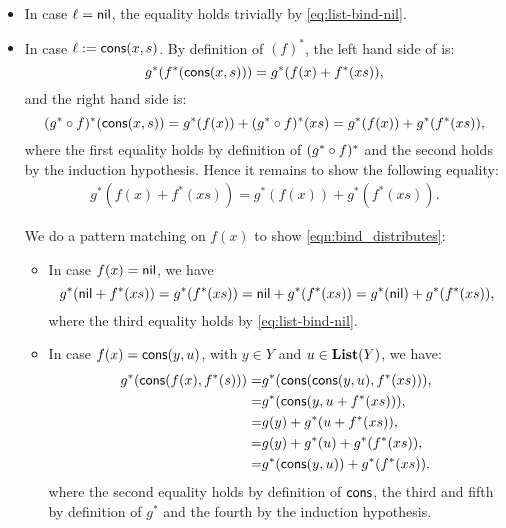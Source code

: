 \begin{solution}
\begin{enumerate}
\begin{itemize}
\item In case $\ell = \nil$, the equality holds trivially by \cref{eq:list-bind-nil}.

\item In case $\ell := \cons(x,s)$. By definition of $(f)^{*}$, the left hand side of is:
\[
g^{*}(f^{*}(\cons(x,s))) = g^{*}(f(x) + f^{*}(xs)),
\]
and the right hand side is:
\[
(\co{f}{g^{*}})^{*}(\cons(x,s)) = g^{*}(f(x)) + (\co{f}{g^{*}})^{*}(xs) = g^{*}(f(x)) + g^{*}(f^{*}(xs)),
\]
where the first equality holds by definition of $(\co{f}{g^{*}})^{*}$ and the second holds by the induction hypothesis. Hence it remains to show the following equality:
\begin{align}\label{eqn:bind_distributes}
g^{*}(f(x) + f^{*}(xs)) = g^{*}(f(x)) + g^{*}(f^{*}(xs)).
\end{align}

We do a pattern matching on $f(x)$ to show \cref{eqn:bind_distributes}:
\begin{itemize}
\item In case $f(x) = \nil$, we have
\[
g^{*}(\nil + f^{*}(xs)) = g^{*}(f^{*}(xs)) = \nil + g^{*}(f^{*}(xs)) = g^{*}(\nil) + g^{*}(f^{*}(xs)),
\]
where the third equality holds by \cref{eq:list-bind-nil}.
\item In case $f(x) = \cons(y,u)$, with $y\in Y$ and $u\in \List(Y)$, we have:
\begin{eqnarray*}
g^{*}(\cons(f(x),f^{*}(s))) =& g^{*}(\cons(\cons(y,u), f^{*}(xs))), \\
	=& g^{*}(\cons(y, u + f^{*}(xs))),\\
	=& g(y) + g^{*}(u + f^{*}(xs)),\\
	=& g(y) + g^{*}(u) + g^{*}(f^{*}(xs)),\\
	=& g^{*}(\cons(y,u)) + g^{*}(f^{*}(xs)).
\end{eqnarray*}
where the second equality holds by definition of $\cons$, the third and fifth by definition of $g^{*}$ and the fourth by the induction hypothesis.

\end{itemize}
\end{itemize}
\end{enumerate}
\end{solution}

